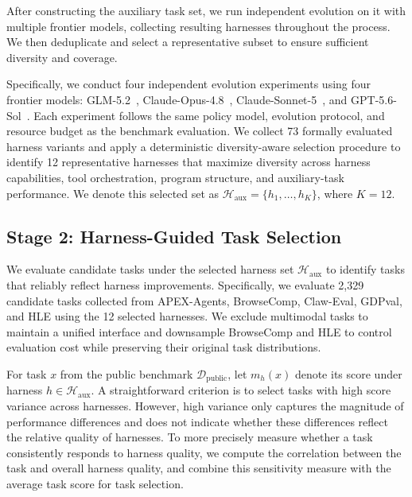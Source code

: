 After constructing the auxiliary task set, we run independent evolution on it with multiple frontier models, collecting resulting harnesses throughout the process. We then deduplicate and select a representative subset to ensure sufficient diversity and coverage.

Specifically, we conduct four independent evolution experiments using four frontier models: GLM-5.2~\cite{glm52}, Claude-Opus-4.8~\cite{anthropic2026opus}, Claude-Sonnet-5~\cite{anthropic2026sonnet}, and GPT-5.6-Sol~\cite{gpt56}. Each experiment follows the same policy model, evolution protocol, and resource budget as the benchmark evaluation. We collect 73 formally evaluated harness variants and apply a deterministic diversity-aware selection procedure to identify 12 representative harnesses that maximize diversity across harness capabilities, tool orchestration, program structure, and auxiliary-task performance. We denote this selected set as $\mathcal{H}_{\mathrm{aux}}=\{h_1,\ldots,h_K\}$, where $K=12$.



\subsection{Stage 2: Harness-Guided Task Selection}
\label{sec:harness-response-prior}

We evaluate candidate tasks under the selected harness set $\mathcal{H}_{\mathrm{aux}}$ to identify tasks that reliably reflect harness improvements. Specifically, we evaluate 2,329 candidate tasks collected from APEX-Agents, BrowseComp, Claw-Eval, GDPval, and HLE using the 12 selected harnesses. We exclude multimodal tasks to maintain a unified interface and downsample BrowseComp and HLE to control evaluation cost while preserving their original task distributions.


For task $x$ from the public benchmark $\mathcal{D}_{\mathrm{public}}$, let $m_h(x)$ denote its score under harness $h\in\mathcal{H}_{\mathrm{aux}}$. 
A straightforward criterion is to select tasks with high score variance across harnesses.
However, high variance only captures the magnitude of performance differences and does not indicate whether these differences reflect the relative quality of harnesses.
To more precisely measure whether a task consistently responds to harness quality, we compute the correlation between the task and overall harness quality, and combine this sensitivity measure with the average task score for task selection.



